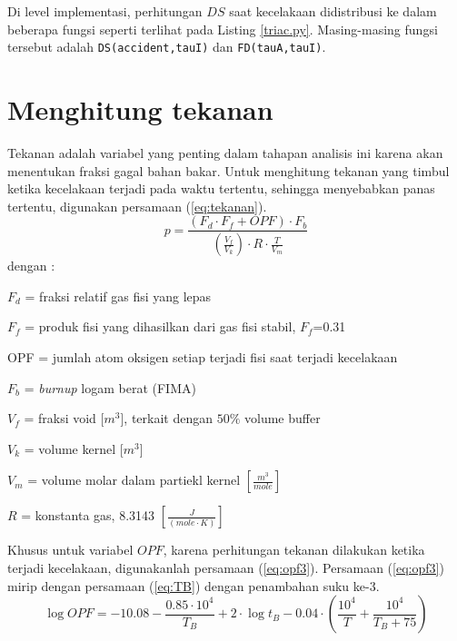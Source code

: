 \documentclass[a4paper,11pt]{report}
\begin{document}
Di level implementasi, perhitungan $DS$ saat kecelakaan didistribusi ke dalam beberapa fungsi seperti terlihat pada Listing \ref{triac.py}. Masing-masing fungsi tersebut adalah \texttt{DS(accident,tauI)} dan \texttt{FD(tauA,tauI)}.

\section{Menghitung tekanan}
Tekanan adalah variabel yang penting dalam tahapan analisis ini karena akan menentukan fraksi gagal bahan bakar. Untuk menghitung tekanan yang timbul ketika kecelakaan terjadi pada waktu tertentu, sehingga menyebabkan panas tertentu, digunakan persamaan (\ref{eq:tekanan}). 
\begin{equation}
  p=\frac{(F_d \cdot F_f + OPF) \cdot F_b}{\left( \frac{V_f}{V_k}\right) \cdot R \cdot \frac{T}{V_m}}
  \label{eq:tekanan}
\end{equation}
dengan :
\begin{description}
  \item $F_d$ = fraksi relatif gas fisi yang lepas 
  \item $F_f$ = produk fisi yang dihasilkan dari gas fisi stabil, $F_f$=0.31
  \item OPF = jumlah atom oksigen setiap terjadi fisi saat terjadi kecelakaan
  \item $F_b$ = \textit{burnup} logam berat (FIMA)
  \item $V_f$ = fraksi void [$m^3$], terkait dengan $50\%$ volume buffer 
  \item $V_k$ = volume kernel [$m^3$]
  \item $V_m$ = volume molar dalam partiekl kernel $\left[\frac{m^3}{mole} \right]$
  \item $R$ = konstanta gas, 8.3143 $\left[\frac{J}{(mole \cdot K)} \right]$
\end{description}

Khusus untuk variabel $OPF$, karena perhitungan tekanan dilakukan ketika terjadi kecelakaan, digunakanlah persamaan (\ref{eq:opf3}). Persamaan (\ref{eq:opf3}) mirip dengan persamaan (\ref{eq:TB}) dengan penambahan suku ke-3.
\begin{equation}
  \log OPF=-10.08-\frac{0.85 \cdot 10^4}{T_B} + 2 \cdot \log t_B - 0.04 \cdot \left( \frac{10^4}{T} + \frac{10^4}{T_B + 75} \right)
  \label{eq:opf3}
\end{equation}
\end{document}
